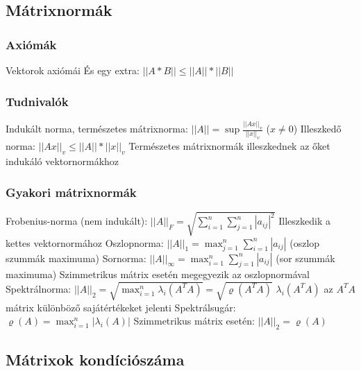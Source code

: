 \documentclass[12pt,a4paper]{article}
\begin{document}
\pagebreak

\subsection{Mátrixnormák}

\subsubsection{Axiómák}

\begin{outline}
	\1 Vektorok axiómái
	\1 És egy extra: $||A*B|| \le ||A|| * ||B||$
\end{outline}

\subsubsection{Tudnivalók}

\begin{outline}
	\1 Indukált norma, természetes mátrixnorma: $||A|| = \sup \frac{||Ax||_v}{||x||_v}$ \; ($x \ne 0$)
	\1 Illeszkedő norma: $||Ax||_v \le ||A|| * ||x||_v$
	\1 Természetes mátrixnormák illeszkednek az őket indukáló vektornormákhoz
\end{outline}

\subsubsection{Gyakori mátrixnormák}

\begin{outline}
	\1 Frobenius-norma (nem indukált): $||A||_F = \sqrt{ \sum_{i=1}^{n} \sum_{j=1}^{n} |a_{ij}|^2 }$
		\2 Illeszkedik a kettes vektornormához
	\1 Oszlopnorma: $||A||_1 = \max_{j=1}^n \sum_{i=1}^{n} |a_{ij}|$ \;\; (oszlop szummák maximuma)
	\1 Sornorma: $||A||_\infty = \max_{i=1}^n \sum_{j=1}^{n} |a_{ij}|$ \;\; (sor szummák maximuma)
		\2 Szimmetrikus mátrix esetén megegyezik az oszlopnormával
	\1 Spektrálnorma: $||A||_2 = \sqrt{\max_{i=1}^{n} \lambda_i (A^T A)} = \sqrt{\varrho(A^TA)}$
		\2 $\lambda_i(A^T A)$ az $A^T A$ mátrix különböző sajátértékeket jelenti
		\2 Spektrálsugár: $\varrho(A) = \max_{i=1}^{n} |\lambda_i(A)|$
		\2 Szimmetrikus mátrix esetén: $||A||_2 = \varrho(A)$
\end{outline}

\pagebreak

\subsection{Mátrixok kondíciószáma}
\end{document}
